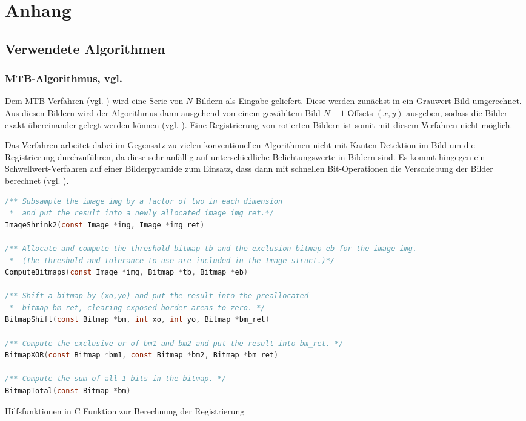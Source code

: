 \chapter{Anhang}
\section{Verwendete Algorithmen}

\subsection{MTB-Algorithmus, vgl. \cite[S.9 f]{Ward03fast}}
\label{subsec:MTB}
Dem \gls{MTB} Verfahren (vgl. \cite{Ward03fast}) wird eine Serie von $N$ Bildern als Eingabe geliefert. Diese werden zunächst in ein Grauwert-Bild umgerechnet. Aus diesen Bildern wird der Algorithmus dann ausgehend von einem gewähltem Bild $N-1$ Offsets $(x,y)$ ausgeben, sodass die Bilder exakt übereinander gelegt werden können (vgl. \cite[S. 123f]{Reinhard}). Eine Registrierung von rotierten Bildern ist somit mit diesem Verfahren nicht möglich. 

Das Verfahren arbeitet dabei im Gegensatz zu vielen konventionellen Algorithmen nicht mit Kanten-Detektion im Bild um die Registrierung durchzuführen, da diese sehr anfällig auf unterschiedliche Belichtungswerte in Bildern sind. Es kommt hingegen ein Schwellwert-Verfahren auf einer Bilderpyramide zum Einsatz, dass dann mit schnellen Bit-Operationen die Verschiebung der Bilder berechnet (vgl. \cite{Ward03fast}). 

\begin{Listing}[H]
\label{lst:MTB:helpers}
\begin{lstlisting}[language=c]
/** Subsample the image img by a factor of two in each dimension 
 *  and put the result into a newly allocated image img_ret.*/
ImageShrink2(const Image *img, Image *img_ret)

/** Allocate and compute the threshold bitmap tb and the exclusion bitmap eb for the image img. 
 *  (The threshold and tolerance to use are included in the Image struct.)*/
ComputeBitmaps(const Image *img, Bitmap *tb, Bitmap *eb)

/** Shift a bitmap by (xo,yo) and put the result into the preallocated 
 *  bitmap bm_ret, clearing exposed border areas to zero. */
BitmapShift(const Bitmap *bm, int xo, int yo, Bitmap *bm_ret)

/** Compute the exclusive-or of bm1 and bm2 and put the result into bm_ret. */
BitmapXOR(const Bitmap *bm1, const Bitmap *bm2, Bitmap *bm_ret)

/** Compute the sum of all 1 bits in the bitmap. */
BitmapTotal(const Bitmap *bm)
\end{lstlisting}
\caption{Hilfsfunktionen in C Funktion zur Berechnung der Registrierung \cite{Ward03fast}}

\end{Listing}

